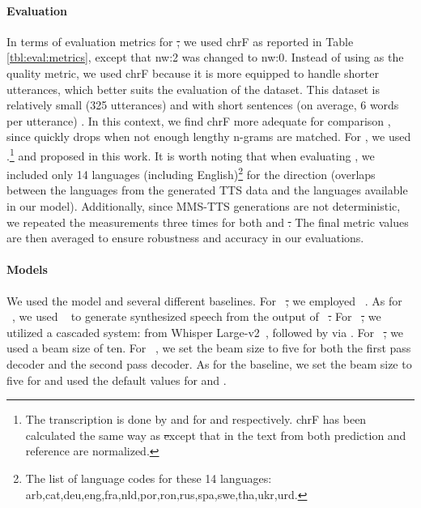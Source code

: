 \paragraph{Evaluation} %
In terms of evaluation metrics for \st,
we used chrF as reported in Table \ref{tbl:eval:metrics}, except that nw:2 was changed to nw:0. 
Instead of using \bleu as the quality metric, we used chrF because it is more equipped to handle shorter utterances, which better suits the evaluation of the
\multilingualholisticbias dataset. This dataset is relatively small (325 utterances) and with short sentences (on average, 6 words per utterance) \citep{costa2023multilingual}. 
In this context, we find chrF more adequate for comparison \citep{ma-etal-2019-results}, since \bleu quickly drops when not enough lengthy n-grams are matched. For \sst, we used \asrchrf.\footnote{The transcription is done by \whisperlarge and \whispermedium \citep{whisper} for \engx and \xeng respectively. chrF has been calculated the same way as \st except that in \sst the text from both prediction and reference are normalized.} 
and \blaser proposed in this work. It is worth noting that when evaluating \blaser, we included only 14 languages (including English)\footnote{The list of 
language codes for these 14 languages: arb,cat,deu,eng,fra,nld,por,ron,rus,spa,swe,tha,ukr,urd.} for the \engx direction (overlaps between the languages from the generated TTS data and the languages available in our \sst model). %
Additionally, since MMS-TTS generations are not deterministic, we repeated the measurements three times for both \sst and \st. The final metric values are then averaged to ensure robustness and accuracy in our evaluations.

\paragraph{Models} We used the \mfourtlg model and several different baselines. For \xeng\ \st, we employed \whisperlarge~\citep{whisper}. As for \xeng\ \sst, we used  \yourtts ~\citep{casanova2022yourtts} to generate synthesized speech from the output of \whisperlarge\ \st. For \engx\ \st, we utilized a cascaded system: \asr from Whisper Large-v2~\citep{whisper}, followed by \mt via \nllbmedium \citep{nllb2022}.
For \mfourtlg\ \st, we used a beam size of ten. For \mfourtlg\  \sst, we set the beam size to five for both the first pass decoder and the second pass decoder. As for the baseline, we set the beam size to five for \nllbmedium and used the default values for \whisperlarge and \yourtts.

